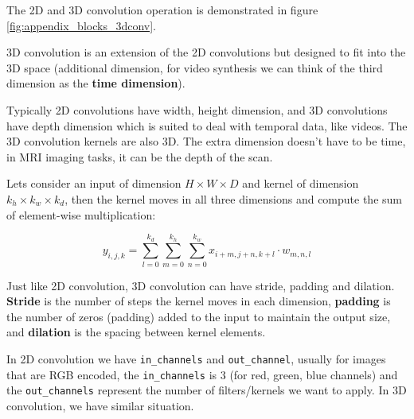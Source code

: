 The 2D and 3D convolution operation is demonstrated in figure \ref{fig:appendix_blocks_3dconv}.

3D convolution is an extension of the 2D convolutions but designed to fit into the 3D space (additional dimension, for video synthesis we can think of the third dimension as the \textbf{time dimension}).

Typically 2D convolutions have width, height dimension, and 3D convolutions have depth dimension which is suited to deal with temporal data, like videos. The 3D convolution kernels are also 3D. The extra dimension doesn't have to be time, in MRI imaging tasks, it can be the depth of the scan.

Lets consider an input of dimension $H \times W \times D$ and kernel of dimension $k_h \times k_w \times k_d$, then the kernel moves in all three dimensions and compute the sum of element-wise multiplication:

\begin{equation*}
    y_{i,j,k} = \sum_{l=0}^{k_d} \sum_{m=0}^{k_h} \sum_{n=0}^{k_w} x_{i+m,j+n,k+l} \cdot w_{m,n,l}
\end{equation*}

Just like 2D convolution, 3D convolution can have stride, padding and dilation. \textbf{Stride} is the number of steps the kernel moves in each dimension, \textbf{padding} is the number of zeros (padding) added to the input to maintain the output size, and \textbf{dilation} is the spacing between kernel elements.

In 2D convolution we have \texttt{in\_channels} and \texttt{out\_channel}, usually for images that are RGB encoded, the \texttt{in\_channels} is 3 (for red, green, blue channels) and the \texttt{out\_channels} represent the number of filters/kernels we want to apply. In 3D convolution, we have similar situation. 
